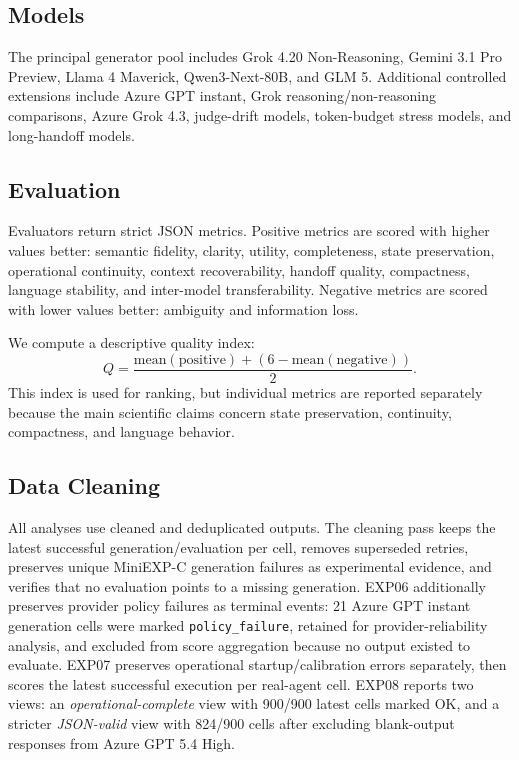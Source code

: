 \documentclass[11pt]{article}
\begin{document}
\subsection{Models}
The principal generator pool includes Grok 4.20 Non-Reasoning, Gemini 3.1 Pro Preview, Llama 4 Maverick, Qwen3-Next-80B, and GLM 5. Additional controlled extensions include Azure GPT instant, Grok reasoning/non-reasoning comparisons, Azure Grok 4.3, judge-drift models, token-budget stress models, and long-handoff models.

\subsection{Evaluation}
Evaluators return strict JSON metrics. Positive metrics are scored with higher values better: semantic fidelity, clarity, utility, completeness, state preservation, operational continuity, context recoverability, handoff quality, compactness, language stability, and inter-model transferability. Negative metrics are scored with lower values better: ambiguity and information loss.

We compute a descriptive quality index:
\[
Q = \frac{\mathrm{mean}(\mathrm{positive}) + (6 - \mathrm{mean}(\mathrm{negative}))}{2}.
\]
This index is used for ranking, but individual metrics are reported separately because the main scientific claims concern state preservation, continuity, compactness, and language behavior.

\subsection{Data Cleaning}
All analyses use cleaned and deduplicated outputs. The cleaning pass keeps the latest successful generation/evaluation per cell, removes superseded retries, preserves unique MiniEXP-C generation failures as experimental evidence, and verifies that no evaluation points to a missing generation. EXP06 additionally preserves provider policy failures as terminal events: 21 Azure GPT instant generation cells were marked \texttt{policy\_failure}, retained for provider-reliability analysis, and excluded from score aggregation because no output existed to evaluate. EXP07 preserves operational startup/calibration errors separately, then scores the latest successful execution per real-agent cell. EXP08 reports two views: an \emph{operational-complete} view with 900/900 latest cells marked OK, and a stricter \emph{JSON-valid} view with 824/900 cells after excluding blank-output responses from Azure GPT 5.4 High.
\end{document}
